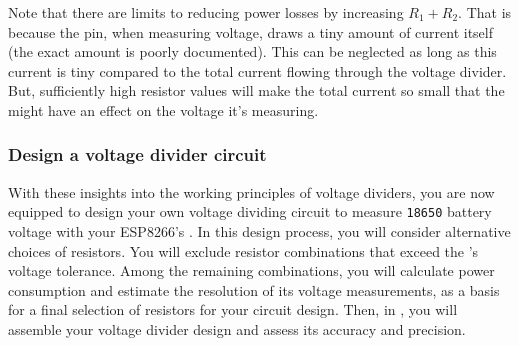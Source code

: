 Note that there are limits to reducing power losses by increasing $R_1+R_2$.
That is because the \adc pin, when measuring voltage, draws a tiny amount of current itself (the exact amount is poorly documented).
This can be neglected as long as this current is tiny compared to the total current flowing through the voltage divider. 
But, sufficiently high resistor values will make the total current so small that the \adc might have an effect on the voltage it's measuring.

\subsubsection{\howto Design a voltage divider circuit}
With these insights into the working principles of voltage dividers, you are now equipped to design your own voltage dividing circuit to measure \texttt{18650} battery voltage with your ESP8266's \adc. 
In this design process, you will consider alternative choices of resistors.
You will exclude resistor combinations that exceed the \adc's voltage tolerance.
Among the remaining combinations, you will calculate power consumption and estimate the resolution %
of its voltage measurements, as a basis for a final selection of resistors for your circuit design. 
Then, in , you will assemble your voltage divider design and assess its accuracy and precision. 
